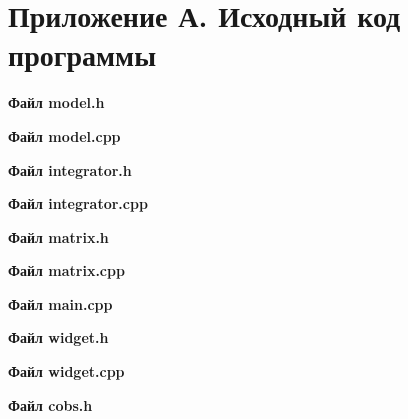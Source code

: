 \documentclass[14pt,a4paper]{extreport}
\begin{document}
\newpage
\chapter*{Приложение А. Исходный код программы}

\textbf{Файл model.h}
\begin{alltt}
    
\end{alltt}

\textbf{Файл model.cpp}
\begin{alltt}
    
\end{alltt}

\textbf{Файл integrator.h}
\begin{alltt}
    
\end{alltt}

\textbf{Файл integrator.cpp}
\begin{alltt}
    
\end{alltt}

\textbf{Файл matrix.h}
\begin{alltt}
    
\end{alltt}

\textbf{Файл matrix.cpp}
\begin{alltt}
    
\end{alltt}

\textbf{Файл main.cpp}
\begin{alltt}
    
\end{alltt}

\textbf{Файл widget.h}
\begin{alltt}
    
\end{alltt}

\textbf{Файл widget.cpp}
\begin{alltt}
    
\end{alltt}

\textbf{Файл cobs.h}
\begin{alltt}
    
\end{alltt}
\end{document}
